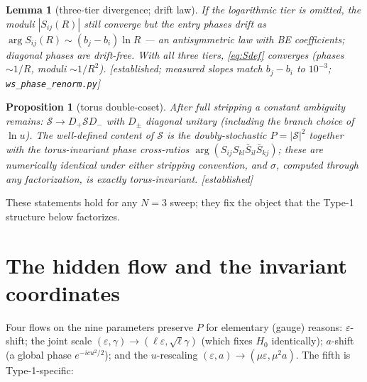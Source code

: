 \documentclass[11pt]{article}
\newtheorem{proposition}{Proposition}
\newtheorem{lemma}{Lemma}
\theoremstyle{definition}
\theoremstyle{remark}
\newcommand{\eps}{\varepsilon}
\newcommand{\Scat}{\mathcal{S}}
\newcommand{\evidence}[1]{\textnormal{\small[\textit{#1}]}}
\begin{document}
\begin{lemma}[three-tier divergence; drift law]\label{lem:drift}
If the logarithmic tier is omitted, the moduli $|S_{ij}(R)|$ still converge but the
entry phases drift as
$\arg S_{ij}(R)\sim(b_j-b_i)\ln R$ --- an antisymmetric law with BE coefficients;
diagonal phases are drift-free. With all three tiers, \eqref{eq:Sdef} converges
(phases $\sim1/R$, moduli $\sim1/R^2$). \evidence{established; measured slopes match
$b_j-b_i$ to $10^{-3}$; \texttt{ws\_phase\_renorm.py}}
\end{lemma}

\begin{proposition}[torus double-coset]\label{prop:coset}
After full stripping a constant ambiguity remains: $\Scat\to D_+\Scat D_-$ with
$D_\pm$ diagonal unitary (including the branch choice of $\ln u$). The well-defined
content of $\Scat$ is the doubly-stochastic $P=|\Scat|^2$ together with the
torus-invariant phase cross-ratios $\arg(S_{ij}S_{kl}\bar S_{il}\bar S_{kj})$; these are
numerically identical under either stripping convention, and $\sigma$, computed through
any factorization, is exactly torus-invariant. \evidence{established}
\end{proposition}

These statements hold for any $N{=}3$ sweep; they fix the object that the Type-1
structure below factorizes.

\section{The hidden flow and the invariant coordinates}\label{sec:flow}

Four flows on the nine parameters preserve $P$ for elementary (gauge) reasons:
$\eps$-shift; the joint scale $(\eps,\gamma)\to(\ell\eps,\sqrt\ell\gamma)$ (which fixes
$H_0$ identically); $a$-shift (a global phase $e^{-icu^2/2}$); and the $u$-rescaling
$(\eps,a)\to(\mu\eps,\mu^2a)$. The fifth is Type-1-specific:
\end{document}
